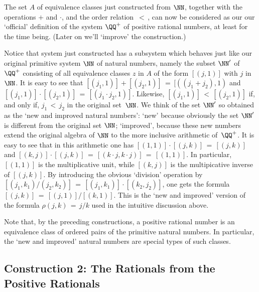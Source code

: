 {%

        The set $A$ of equivalence classes just constructed from ${\NN}$, together with the operations $+$ and ${\cdot}$, and the order relation $\,<\,$,
    can now  be considered as our our `official' definition of the system ${\QQ}^{+}$ of positive rational numbers, at least for the time being.
    (Later on we'll `improve' the construction.)

        Notice that system just constructed has a subsystem which behaves just like our original primitive system ${\NN}$ of natural numbers,
    namely the subset ${\NN}'$ of ${\QQ}^{+}$ consisting of all equivalence classes $z$ in $A$ of the form $[(j,1)]$ with $j$ in ${\NN}$.
    It is easy to see that $[(j_{1},1)] + [(j_{2},1)] \,=\, [((j_{1}+j_{2}),1)$ and $[(j_{1},1)]{\cdot}[(j_{2},1)] \,=\, [(j_{1}{\cdot}j_{2},1)]$.
    Likewise, $[(j_{1},1)]\,<\,[(j_{2},1)]$ if, and only if, $j_{1}\,<\,j_{2}$ in the original set~${\NN}$.
    We think of the set ${\NN}'$ so obtained as the `new and improved natural numbers':
    `new' because obviously the set ${\NN}'$ is different from the original set ${\NN}$;
    `improved', because these new numbers extend the original algebra of ${\NN}$ to the more inclusive arithmetic of~${\QQ}^{+}$.
    It is easy to see that in this arithmetic one has $[(1,1)]{\cdot}[(j,k)] \,=\, [(j,k)]$
    and $[(k,j)]{\cdot}[(j,k)] \,=\, [(k{\cdot}j,k{\cdot}j)] \,=\, [(1,1)]$. In particular,
    $[(1,1)]$ is the multiplicative unit, while $[(k,j)]$ is the multipicative inverse of $[(j,k)]$.
    By introducing the obvious `division' operation by $[(j_{1},k_{1})/(j_{2},k_{2})] \,=\, [(j_{1},k_{1})]{\cdot}[(k_{2},j_{2})]$,
    one gets the formula $[(j,k)] \,=\, [(j,1)]/[(k,1)]$. This is the `new and improved'
    version of the formula ${\rho}(j,k) \,=\, j/k$ used in the intuitive discussion above.

        Note that, by the preceding constructions, a positive rational number is an equivalence class of ordered pairs of the primitive natural numbers.
    In particular, the `new and improved' natural numbers are special types of such classes.



        \subsection{\small{{\bf Construction 2: The Rationals from the Positive Rationals}}}
                \label{ConstA50.130B}

}
